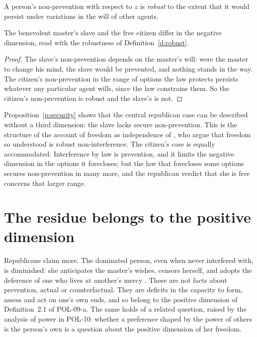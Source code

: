 \documentclass{situationist-preprint}
\begin{document}
\begin{definition}\label{d:robust}
A person's non-prevention with respect to $z$ is \emph{robust} to the extent that it would persist under variations in the will of other agents.
\end{definition}

\begin{proposition}\label{p:security}
The benevolent master's slave and the free citizen differ in the negative dimension, read with the robustness of Definition~\ref{d:robust}.
\end{proposition}

\begin{proof}
The slave's non-prevention depends on the master's will: were the master to change his mind, the slave would be prevented, and nothing stands in the way. The citizen's non-prevention in the range of options the law protects persists whatever any particular agent wills, since the law constrains them. So the citizen's non-prevention is robust and the slave's is not.
\end{proof}

Proposition~\ref{p:security} shows that the central republican case can be described without a third dimension: the slave lacks secure non-prevention. This is the structure of the account of freedom as independence of \citet{List2016}, who argue that freedom so understood is robust non-interference. The citizen's case is equally accommodated. Interference by law is prevention, and it limits the negative dimension in the options it forecloses; but the law that forecloses some options secures non-prevention in many more, and the republican verdict that she is free concerns that larger range.

\section{The residue belongs to the positive dimension}

Republicans claim more. The dominated person, even when never interfered with, is diminished: she anticipates the master's wishes, censors herself, and adopts the deference of one who lives at another's mercy \citep{Pettit1997}. These are not facts about prevention, actual or counterfactual. They are deficits in the capacity to form, assess and act on one's own ends, and so belong to the positive dimension of Definition~2.1 of POL-09-a. The same holds of a related question, raised by the analysis of power in POL-10: whether a preference shaped by the power of others is the person's own is a question about the positive dimension of her freedom.
\end{document}
